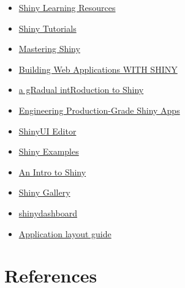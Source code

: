 \documentclass[
  letterpaper,
  DIV=11,
  numbers=noendperiod]{scrreprt}
\providecommand{\tightlist}{%
  \setlength{\itemsep}{0pt}\setlength{\parskip}{0pt}}\usepackage{longtable,booktabs,array}
\newlength{\cslhangindent}
\newlength{\cslentryspacingunit} %
\newenvironment{CSLReferences}[2] %
 {%
  \setlength{\parindent}{0pt}
  \ifodd #1
  \let\oldpar\par
  \def\par{\hangindent=\cslhangindent\oldpar}
  \fi
  \setlength{\parskip}{#2\cslentryspacingunit}
 }%
 {}
\begin{document}

\begin{itemize}
\tightlist
\item
  \href{https://shiny.rstudio.com/tutorial/}{Shiny Learning Resources}
\item
  \href{https://shiny.rstudio.com/tutorial/written-tutorial/lesson1/}{Shiny
  Tutorials}
\item
  \href{https://mastering-shiny.org/}{Mastering Shiny}
\item
  \href{https://rstudio-education.github.io/shiny-course/}{Building Web
  Applications WITH SHINY}
\item
  \href{https://laderast.github.io/gradual_shiny/}{a gRadual
  intRoduction to Shiny}
\item
  \href{https://engineering-shiny.org/}{Engineering Production-Grade
  Shiny Apps}
\item
  \href{https://rstudio.github.io/shinyuieditor/}{ShinyUI Editor}
\item
  \href{https://shinylive.io/r/examples/}{Shiny Examples}
\item
  \href{https://ucsb-meds.github.io/shiny-workshop/\#1}{An Intro to
  Shiny}
\item
  \href{https://shiny.posit.co/r/gallery/}{Shiny Gallery}
\item
  \href{https://rstudio.github.io/shinydashboard/structure.html}{shinydashboard}
\item
  \href{https://shiny.posit.co/r/articles/build/layout-guide/}{Application
  layout guide}
\end{itemize}


\hypertarget{references}{%
\chapter*{References}\label{references}}


\hypertarget{refs}{}
\begin{CSLReferences}{0}{0}
\end{CSLReferences}
\end{document}
